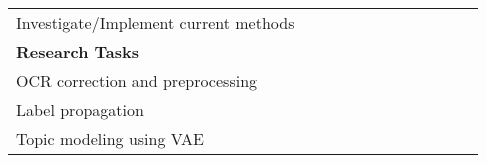 \begin{table}
{\begin{tabular}{l|llclllcllll}
Investigate/Implement current methods & {\cellcolor{blue}}                     & {\cellcolor{blue}}                     &                                        &                                        &                                        &                                        &                                       &                                        &                                        &                                        &                               \\
\textbf{Research Tasks}               &                                        &                                        &                                        &                                        &                                        &                                        &                                       &                                        &                                        &                                        &                               \\
OCR correction and preprocessing      &                                        &                                        & {\cellcolor[rgb]{0.204,1,0.204}}       & {\cellcolor[rgb]{0.204,1,0.204}}       &                                        &                                        &                                       &                                        &                                        &                                        &                               \\
Label propagation                     &                                        &                                        &                                        &                                        & {\cellcolor[rgb]{0.204,1,0.204}}       & {\cellcolor[rgb]{0.204,1,0.204}}       &                                       &                                        &                                        &                                        &                               \\
Topic modeling using VAE              &                                        &                                        &                                        &                                        &                                        & {\cellcolor[rgb]{0.204,1,0.204}}       & {\cellcolor[rgb]{0.204,1,0.204}}      &                                        &                                        &                                        &                               \\

\end{tabular}}
\end{table}
